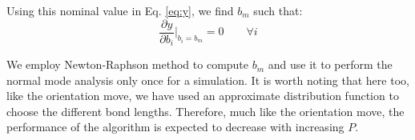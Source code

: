         Using this nominal value in Eq. \eqref{eq:y}, we find $b_m$ such that:
        \begin{equation}
        \label{eq:bm}
            \displaystyle\frac{\partial y}{\partial b_i} \bigg|_{b_i = b_m} = 0 \qquad \forall i
        \end{equation}

        We employ Newton-Raphson method to compute $b_m$ and use it to perform the normal mode analysis only once for a simulation. It is worth noting that here too, like the orientation move, we have used an approximate distribution function to choose the different bond lengths. Therefore, much like the orientation move, the performance of the algorithm is expected to decrease with increasing $P$.
